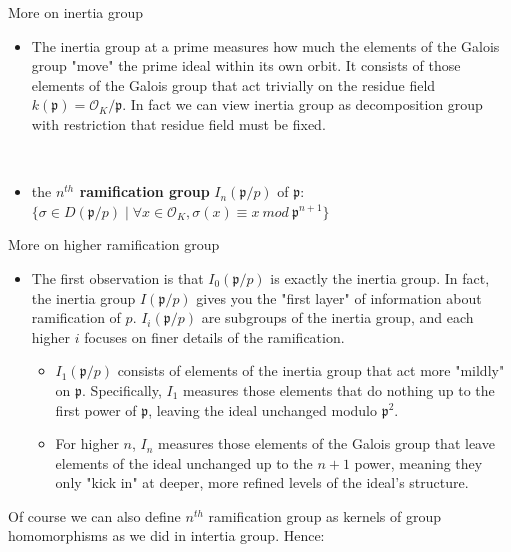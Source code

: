 \begin{rmk} More on inertia group
\begin{itemize}
    \item[] The inertia group at a prime measures how much the elements of the Galois group "move" the prime ideal within its own orbit. It consists of those elements of the Galois group that act trivially on the residue field $k(\mathfrak{p})=\mathcal{O}_K / \mathfrak{p}$. In fact we can view inertia group as decomposition group with restriction that residue field must be fixed.
\end{itemize}
\end{rmk}
\begin{defi}
    ~\begin{itemize}
        \item the \textbf{$n^{th}$ ramification group} $I_n (\mathfrak{p}/p)$ of $\mathfrak{p}$: \\$\{\sigma \in D(\mathfrak{p}/p) \mid \forall x \in \mathcal{O}_K, \sigma(x) \equiv x \ mod \ \mathfrak{p}^{n+1}\}$
    \end{itemize}
\end{defi}
\begin{rmk}More on higher ramification group
    \begin{itemize}
        \item[] The first observation is that $I_0 (\mathfrak{p}/p)$ is exactly the inertia group. In fact, the inertia group $I(\mathfrak{p}/p)$ gives you the "first layer" of information about ramification of $p$. $I_i (\mathfrak{p}/p)$ are subgroups of the inertia group, and each higher $i$ focuses on finer details of the ramification.
        \begin{itemize}
            \item $I_1 (\mathfrak{p}/p)$ consists of elements of the inertia group that act more "mildly" on $\mathfrak{p}$. Specifically, $I_1$ measures those elements that do nothing up to the first power of $\mathfrak{p}$, leaving the ideal unchanged modulo $\mathfrak{p}^2$.
            \item For higher $n$, $I_n$ measures those elements of the Galois group that leave elements of the ideal unchanged up to the $n+1$ power, meaning they only "kick in" at deeper, more refined levels of the ideal’s structure.
        \end{itemize}
    \end{itemize}
\end{rmk}
\noindent
Of course we can also define $n^{th}$ ramification group as kernels of group homomorphisms as we did in intertia group. Hence:
